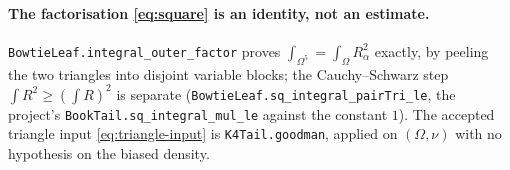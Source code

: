 \documentclass[11pt]{article}
\begin{document}
\paragraph{The factorisation \eqref{eq:square} is an identity, not an
estimate.}
\texttt{BowtieLeaf.integral\_outer\_factor} proves
$\int_{\Omega^5}=\int_\Omega R_\alpha^2$ exactly, by peeling the two triangles
into disjoint variable blocks; the Cauchy--Schwarz step
$\int R^2\geq(\int R)^2$ is separate
(\texttt{BowtieLeaf.sq\_integral\_pairTri\_le}, the project's
\texttt{BookTail.sq\_integral\_mul\_le} against the constant $1$).  The
accepted triangle input \eqref{eq:triangle-input} is
\texttt{K4Tail.goodman}, applied on $(\Omega,\nu)$ with no hypothesis on the
biased density.
\end{document}

